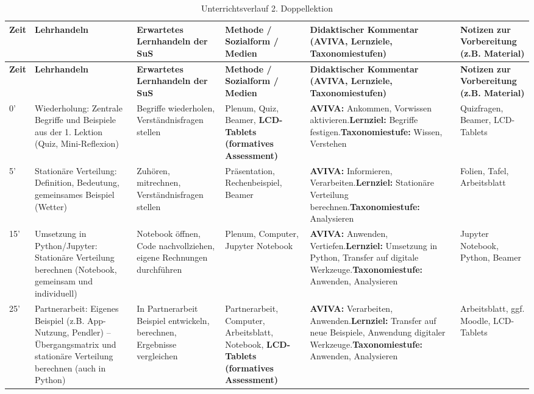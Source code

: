 \begin{landscape}
        \begin{longtable}{@{}l|p{5cm}|p{5cm}|p{4cm}|p{5cm}|p{5cm}@{}}
            \caption{Unterrichtsverlauf 2. Doppellektion}\\
            \textbf{Zeit} & \textbf{Lehrhandeln} & \textbf{Erwartetes Lernhandeln der SuS} & \textbf{Methode / Sozialform / Medien} & \textbf{Didaktischer Kommentar (AVIVA, Lernziele, Taxonomiestufen)} & \textbf{Notizen zur Vorbereitung (z.B. Material)} \\\midrule\midrule
            \endfirsthead
            \textbf{Zeit} & \textbf{Lehrhandeln} & \textbf{Erwartetes Lernhandeln der SuS} & \textbf{Methode / Sozialform / Medien} & \textbf{Didaktischer Kommentar (AVIVA, Lernziele, Taxonomiestufen)} & \textbf{Notizen zur Vorbereitung (z.B. Material)} \\\midrule\midrule
            \endhead
            0'  & Wiederholung: Zentrale Begriffe und Beispiele aus der 1. Lektion (Quiz, Mini-Reflexion) & Begriffe wiederholen, Verständnisfragen stellen & Plenum, Quiz, Beamer, \textbf{LCD-Tablets (formatives Assessment)} & \textbf{AVIVA:} Ankommen, Vorwissen aktivieren.\newline\textbf{Lernziel:} Begriffe festigen.\newline\textbf{Taxonomiestufe:} Wissen, Verstehen & Quizfragen, Beamer, LCD-Tablets \\\midrule
            5'  & Stationäre Verteilung: Definition, Bedeutung, gemeinsames Beispiel (Wetter) & Zuhören, mitrechnen, Verständnisfragen stellen & Präsentation, Rechenbeispiel, Beamer & \textbf{AVIVA:} Informieren, Verarbeiten.\newline\textbf{Lernziel:} Stationäre Verteilung berechnen.\newline\textbf{Taxonomiestufe:} Analysieren & Folien, Tafel, Arbeitsblatt \\\midrule
            15' & Umsetzung in Python/Jupyter: Stationäre Verteilung berechnen (Notebook, gemeinsam und individuell) & Notebook öffnen, Code nachvollziehen, eigene Rechnungen durchführen & Plenum, Computer, Jupyter Notebook & \textbf{AVIVA:} Anwenden, Vertiefen.\newline\textbf{Lernziel:} Umsetzung in Python, Transfer auf digitale Werkzeuge.\newline\textbf{Taxonomiestufe:} Anwenden, Analysieren & Jupyter Notebook, Python, Beamer \\\midrule
            25' & Partnerarbeit: Eigenes Beispiel (z.B. App-Nutzung, Pendler) – Übergangsmatrix und stationäre Verteilung berechnen (auch in Python) & In Partnerarbeit Beispiel entwickeln, berechnen, Ergebnisse vergleichen & Partnerarbeit, Computer, Arbeitsblatt, Notebook, \textbf{LCD-Tablets (formatives Assessment)} & \textbf{AVIVA:} Verarbeiten, Anwenden.\newline\textbf{Lernziel:} Transfer auf neue Beispiele, Anwendung digitaler Werkzeuge.\newline\textbf{Taxonomiestufe:} Anwenden, Analysieren & Arbeitsblatt, ggf. Moodle, LCD-Tablets \\\midrule

\end{longtable}
\end{landscape}
